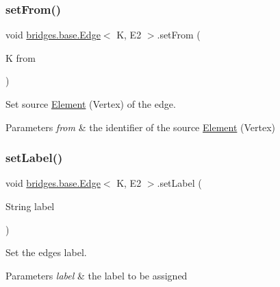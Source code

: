 \subsubsection{\texorpdfstring{set\+From()}{setFrom()}}
{\footnotesize\ttfamily void \hyperlink{classbridges_1_1base_1_1_edge}{bridges.\+base.\+Edge}$<$ K, E2 $>$.set\+From (\begin{DoxyParamCaption}\item[{K}]{from }\end{DoxyParamCaption})}



Set source \hyperlink{classbridges_1_1base_1_1_element}{Element} (Vertex) of the edge. 


\begin{DoxyParams}{Parameters}
{\em from} & the identifier of the source \hyperlink{classbridges_1_1base_1_1_element}{Element} (Vertex) \\
\hline
\end{DoxyParams}
\mbox{\label{classbridges_1_1base_1_1_edge_ad5f1d55a3c8caeb975f497dfe4f29242}} 
\subsubsection{\texorpdfstring{set\+Label()}{setLabel()}}
{\footnotesize\ttfamily void \hyperlink{classbridges_1_1base_1_1_edge}{bridges.\+base.\+Edge}$<$ K, E2 $>$.set\+Label (\begin{DoxyParamCaption}\item[{String}]{label }\end{DoxyParamCaption})}



Set the edge\textquotesingle{}s label. 


\begin{DoxyParams}{Parameters}
{\em label} & the label to be assigned \\
\hline
\end{DoxyParams}
\mbox{\label{classbridges_1_1base_1_1_edge_a1bb8008507d26245468bf9d0f1452072}} 
